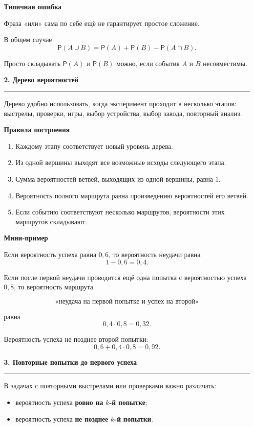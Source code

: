 \documentclass[a4paper,12pt]{article}
\newcommand{\Prob}{\mathsf{P}}
\newcommand{\topichead}[1]{%
  \vspace{0.5em}
  {\Large\bfseries\color{darkaccent}#1\par}
  \vspace{0.35em}
  {\color{accent}\rule{\linewidth}{0.7pt}}
  \vspace{0.5em}
}
\newcommand{\subtopic}[1]{%
  \vspace{0.4em}
  {\large\bfseries\color{darkaccent}#1\par}
  \vspace{0.15em}
}
\begin{document}
\subtopic{Типичная ошибка}

Фраза «или» сама по себе ещё не гарантирует простое сложение.

В общем случае
\[
\Prob(A\cup B)
=
\Prob(A)+\Prob(B)-\Prob(A\cap B).
\]

Просто складывать $\Prob(A)$ и $\Prob(B)$ можно, если события
$A$ и $B$ несовместимы.


\topichead{2. Дерево вероятностей}

Дерево удобно использовать, когда эксперимент проходит в несколько этапов:
выстрелы, проверки, игры, выбор устройства, выбор завода, повторный анализ.

\subtopic{Правила построения}

\begin{enumerate}[label=\arabic*)]
\item Каждому этапу соответствует новый уровень дерева.
\item Из одной вершины выходят все возможные исходы следующего этапа.
\item Сумма вероятностей ветвей, выходящих из одной вершины, равна $1$.
\item Вероятность полного маршрута равна произведению вероятностей его ветвей.
\item Если событию соответствуют несколько маршрутов, вероятности этих
маршрутов складывают.
\end{enumerate}

\subtopic{Мини-пример}

Если вероятность успеха равна $0{,}6$, то вероятность неудачи равна
\[
1-0{,}6=0{,}4.
\]

Если после первой неудачи проводится ещё одна попытка с вероятностью успеха
$0{,}8$, то вероятность маршрута

\[
\text{«неудача на первой попытке и успех на второй»}
\]

равна
\[
0{,}4\cdot0{,}8=0{,}32.
\]

Вероятность успеха не позднее второй попытки:
\[
0{,}6+0{,}4\cdot0{,}8
=
0{,}92.
\]




\topichead{3. Повторные попытки до первого успеха}

В задачах с повторными выстрелами или проверками важно различать:

\begin{itemize}
\item вероятность успеха \textbf{ровно на $k$-й попытке};
\item вероятность успеха \textbf{не позднее $k$-й попытки}.
\end{itemize}
\end{document}
